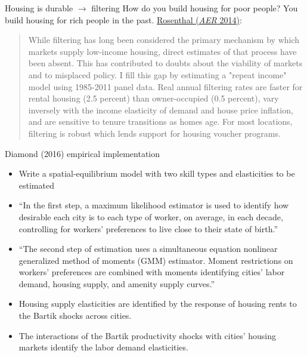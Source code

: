 \documentclass[10pt,notes=hide]{beamer}
\begin{document}
\begin{frame}{Housing is durable $\to$ filtering}
How do you build housing for poor people? You build housing for rich people in the past.
\href{https://www.aeaweb.org/articles?id=10.1257/aer.104.2.687}{Rosenthal (\textit{AER} 2014)}:
\begin{quote}{\small
	While filtering has long been considered the primary mechanism by which markets supply low-income housing, direct estimates of that process have been absent.
	This has contributed to doubts about the viability of markets and to misplaced policy.
	I fill this gap by estimating a "repeat income" model using 1985-2011 panel data.
	Real annual filtering rates are faster for rental housing (2.5 percent) than owner-occupied (0.5 percent), vary inversely with the income elasticity of demand and house price inflation, and are sensitive to tenure transitions as homes age.
	For most locations, filtering is robust which lends support for housing voucher programs.
\par}\end{quote}
\end{frame}
\begin{frame}{Diamond (2016) empirical implementation}
\begin{itemize}
	\item Write a spatial-equilibrium model with two skill types and elasticities to be estimated
	\item ``In the first step, a maximum likelihood estimator is used to identify how desirable each city is to each type of worker, on average, in each decade, controlling for workers' preferences to live close to their state of birth.''
	\item ``The second step of estimation uses a simultaneous equation nonlinear generalized method of moments (GMM) estimator. Moment restrictions on workers' preferences are combined with moments identifying cities' labor demand, housing supply, and amenity supply curves.''
	\item Housing supply elasticities are identified by the response of housing rents to the Bartik shocks across cities. 
	\item The interactions of the Bartik productivity shocks with cities' housing markets identify the labor demand elasticities.
\end{itemize}
\end{frame}
\end{document}
